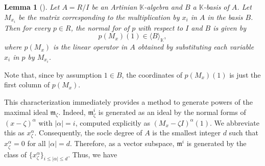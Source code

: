 \documentclass[a4paper,11p]{amsart}
\newcommand{\m}{\mathfrak m}
\newtheorem{defn0}{Definition}[section]
\newtheorem{lemma0}[defn0]{Lemma}
\newenvironment{definition}{ \begin{defn0}}{\end{defn0}}
\newenvironment{lemma}{\bigskip \begin{lemma0}}{\end{lemma0}}
\newcommand{\K}{\mathbb K}
\begin{document}

\begin{lemma}[{\cite[Proposition 3.2]{NormalForm}}]\label{lemma: NormalForm}
    Let $A=R/I$ be an Artinian $\K$-algebra and $B$ a $\K$-basis of $A$. Let $M_{x_i}$ be the matrix corresponding to the multiplication by $x_i$ in $A$ in the basis $B$. Then for every $p\in R$, the normal for of $p$ with respect to $I$ and $B$ is given by 
    $$p(M_x)(1)\in \langle B\rangle_\K,$$ where $p(M_x)$ is the linear operator in $A$ obtained by substituting each variable $x_i$ in $p$ by $M_{x_i}$.
    \end{lemma}

Note that, since by assumption $1\in B$, the coordinates of $p(M_x)(1)$ is just the first column of $p(M_x)$.


This characterization immediately provides a method to generate powers of the maximal ideal $\m_\zeta$. Indeed, $\m_\zeta^i$ is generated as an ideal by the normal forms of $(x-\zeta)^\alpha$ with $|\alpha|=i$, computed explicitly as $(M_x-\zeta I)^\alpha(1)$. We abbreviate this as $x_{\zeta}^\alpha$. Consequently, the socle degree of $A$ is the smallest integer $d$ such that $x_{\zeta}^\alpha=0$ for all $|\alpha|=d$.
Therefore, as a vector subspace, $\m^{i}$ is generated by the class of $\{x_{\zeta}^{\alpha}\}_{i\leq |\alpha|\leq d}$. Thus, we have
\end{document}
